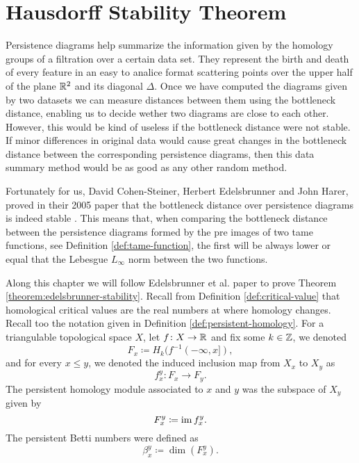 \chapter{Hausdorff Stability Theorem} \label{chap:hausdorff-stability}

Persistence diagrams help summarize the information given by the homology groups of a filtration over a certain data set. They represent the birth and death of every feature in an easy to analice format scattering points over the upper half of the plane $\mathbb R^2 $ and its diagonal $ \Delta $. Once we have computed the diagrams given by two datasets we can measure distances between them using the bottleneck distance, enabling us to decide wether two diagrams are close to each other. However, this would be kind of useless if the bottleneck distance were not stable. If minor differences in original data would cause great changes in the bottleneck distance between the corresponding persistence diagrams, then this data summary method would be as good as any other random method.

Fortunately for us, David Cohen-Steiner, Herbert Edelsbrunner and John Harer, proved in their 2005 paper that the bottleneck distance over persistence diagrams is indeed stable \cite{Edelsbrunner}. This means that, when comparing the bottleneck distance between the persistence diagrams formed by the pre images of two tame functions, see Definition \ref{def:tame-function}, the first will be always lower or equal that the Lebesgue $L_\infty$ norm between the two functions.

Along this chapter we will follow Edelsbrunner et al. paper \cite{Edelsbrunner} to prove Theorem \ref{theorem:edelsbrunner-stability}. Recall from Definition \ref{def:critical-value} that homological critical values are the real numbers at where homology changes. Recall too the notation given in Definition \ref{def:persistent-homology}. For a triangulable topological space $X$, let $ f \colon X \to \mathbb R $ and fix some $ k \in \mathbb Z $, we denoted
\begin{equation}
    F_x \coloneq H_k(f^{-1}(-\infty, x]),
\end{equation}
and for every $ x \leq y $, we denoted the induced inclusion map from $ X_x $ to $ X_y $ as
\begin{equation}
    f_x^y \colon F_x \to F_y.
\end{equation}
The persistent homology module associated to $ x $ and $ y $ was the subspace of $X_y$ given by 
\begin{equation}
    F_x^y \coloneq \operatorname{im} f_x^y.
\end{equation}
The persistent Betti numbers were defined as
\begin{equation}
    \beta_x^y \coloneq \dim(F_x^y).
\end{equation}

